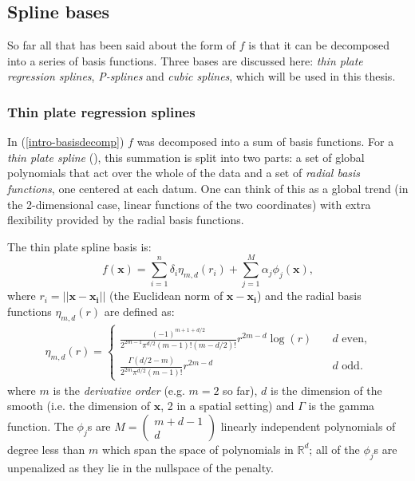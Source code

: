 \subsection{Spline bases}

So far all that has been said about the form of $f$ is that it can be decomposed into a series of basis functions. Three bases are discussed here: \textit{thin plate regression splines}, \textit{P-splines} and \textit{cubic splines}, which will be used in this thesis.

\subsubsection{Thin plate regression splines}
\label{GAMtprs}
\label{GAMtprspenalty}

In (\ref{intro-basisdecomp}) $f$ was decomposed into a sum of basis functions. For a \textit{thin plate spline} (\cite{duchon77}), this summation is split into two parts: a set of global polynomials that act over the whole of the data and a set of \textit{radial basis functions}, one centered at each datum. One can think of this as a global trend (in the 2-dimensional case, linear functions of the two coordinates) with extra flexibility provided by the radial basis functions.

The thin plate spline basis is:
\begin{equation}
f(\mathbf{x}) = \sum_{i=1}^n \delta_i \eta_{m,d}(r_i) + \sum_{j=1}^M \alpha_j \phi_j(\mathbf{x}),
\label{tprs-basis} 
\end{equation}
where $r_i=\lvert \lvert \mathbf{x}-\mathbf{x_i}\rvert \rvert$ (the Euclidean norm of $ \mathbf{x}-\mathbf{x_i}$) and the radial basis functions $\eta_{m,d}(r)$ are defined as:
\begin{align*}
\eta_{m,d}(r) =\begin{cases} \frac{(-1)^{m+1+d/2}}{2^{2m-1}\pi^{d/2}(m-1)!(m-d/2)!} r^{2m-d} \log(r) &\quad{\text{$d$ even,}}\\
\frac{\Gamma(d/2-m)}{2^{2m}\pi^{d/2}(m-1)!} r^{2m-d} &\quad{\text{$d$ odd.}}
\end{cases}
\end{align*}
where $m$ is the \textit{derivative order} (e.g. $m=2$ so far), $d$ is the dimension of the smooth (i.e. the dimension of $\mathbf{x}$, 2 in a spatial setting) and $\Gamma$ is the gamma function. The $\phi_j$s are $M=\left( \begin{smallmatrix} m+d-1 \\ d  \end{smallmatrix}\right)$ linearly independent polynomials of degree less than $m$ which span the space of polynomials in $\mathbb{R}^d$; all of the $\phi_j$s are unpenalized as they lie in the nullspace of the penalty.

